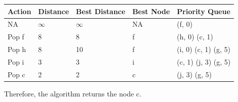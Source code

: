 \documentclass[paper=a4, fontsize=11pt]{scrartcl} %
\numberwithin{equation}{section} %
\numberwithin{figure}{section} %
\numberwithin{table}{section} %
\begin{document}
\begin{center}
    \begin{tabular}{| l | l | l | l | p{6cm} |}
    \hline
    Action & Distance & Best Distance & Best Node & Priority Queue \\ 
    \hline    
    NA & $\infty$ & $\infty$ & NA & (f, 0) \\ 
    \hline    
    Pop f & 8 & 8 & f & (h, 0) (c, 1) \\ 
    \hline    
    Pop h & 8 & 10 & f & (i, 0) (c, 1) (g, 5)  \\
    \hline
    Pop i & 3 & 3 & i & (c, 1) (j, 3) (g, 5) \\
    \hline
    Pop c & 2 & 2 & c & (j, 3) (g, 5) \\
    \hline
    \end{tabular}
\end{center}
Therefore, the algorithm returns the node c. 
\end{document}
